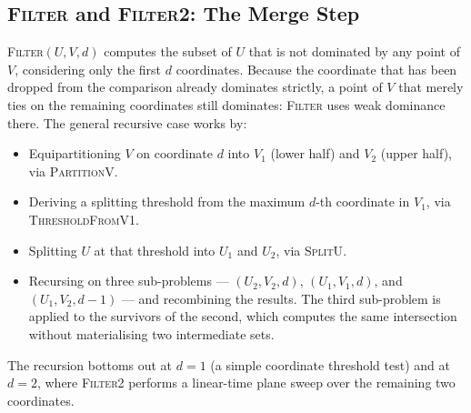 \documentclass[11pt]{article}
\begin{document}


\subsection{\textsc{Filter} and \textsc{Filter2}: The Merge Step}

\textsc{Filter}$(U, V, d)$ computes the subset of $U$ that is not
dominated by any point of $V$, considering only the first $d$
coordinates. Because the coordinate that has been dropped from the
comparison already dominates strictly, a point of $V$ that merely ties
on the remaining coordinates still dominates: \textsc{Filter} uses weak
dominance there. The general recursive case works by:
\begin{itemize}
    \item Equipartitioning $V$ on coordinate $d$ into $V_1$ (lower half)
    and $V_2$ (upper half), via \textsc{PartitionV}.
    \item Deriving a splitting threshold from the maximum $d$-th
    coordinate in $V_1$, via \textsc{ThresholdFromV1}.
    \item Splitting $U$ at that threshold into $U_1$ and $U_2$, via
    \textsc{SplitU}.
    \item Recursing on three sub-problems --- $(U_2, V_2, d)$,
    $(U_1, V_1, d)$, and $(U_1, V_2, d-1)$ --- and recombining the
    results. The third sub-problem is applied to the survivors of the
    second, which computes the same intersection without materialising
    two intermediate sets.
\end{itemize}
The recursion bottoms out at $d = 1$ (a simple coordinate threshold
test) and at $d = 2$, where \textsc{Filter2} performs a linear-time
plane sweep over the remaining two coordinates.











\end{document}
